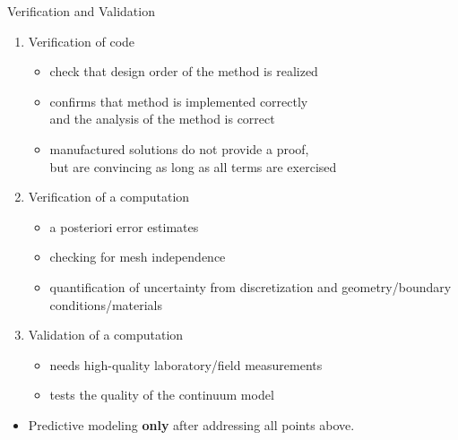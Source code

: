 \begin{frame}{Verification and Validation}
  \begin{enumerate}
  \item Verification of code
    \begin{itemize}
    \item check that design order of the method is realized
    \item confirms that method is implemented correctly \\
      and the analysis of the method is correct
    \item manufactured solutions do not provide a proof, \\
      but are convincing as long as all terms are exercised
    \end{itemize}
  \item Verification of a computation
    \begin{itemize}
    \item a posteriori error estimates
    \item checking for mesh independence
    \item quantification of uncertainty from discretization and geometry/boundary conditions/materials
    \end{itemize}
  \item Validation of a computation
    \begin{itemize}
    \item needs high-quality laboratory/field measurements
    \item tests the quality of the continuum model
    \end{itemize}
  \end{enumerate}
  \begin{itemize}
  \item<2> \alert{Predictive modeling \textbf{only} after addressing all points above.}
  \end{itemize}
\end{frame}

